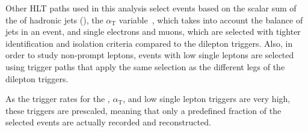 Other HLT paths used in this analysis select events based on the scalar sum of the \pt of hadronic jets (\HT), the $\alpha_{\mathrm{T}}$ variable~\cite{Khachatryan2011196}, which takes into account the balance of jets in an event, and single electrons and muons, which are selected with tighter identification and isolation criteria compared to the dilepton triggers. Also, in order to study non-prompt leptons, events with low \pt single leptons are selected using trigger paths that apply the same selection as the different legs of the dilepton triggers.  

As the trigger rates for the \HT, $\alpha_{\mathrm{T}}$, and low \pt single lepton triggers are very high, these triggers are prescaled, meaning that only a predefined fraction of the selected events are actually recorded and reconstructed.

  



